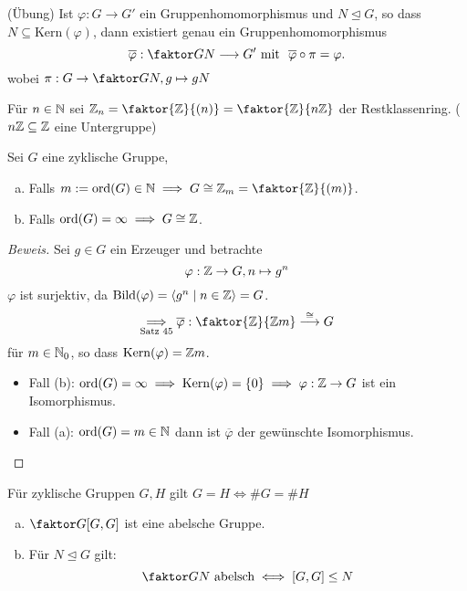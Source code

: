 \documentclass[a4paper]{report}
\begin{document}
\begin{satz45'}[Homomorphiesatz'](Übung)
  Ist $\varphi : G \to G'$ ein Gruppenhomomorphismus und $N \trianglelefteq G$, so dass $N \subseteq \mathrm{Kern}(\varphi)$, dann existiert genau ein Gruppenhomomorphismus $$\overline\varphi : \faktor GN \longrightarrow G'\text{ mit }\ \overline\varphi \circ \pi = \varphi.$$
  wobei $\pi : G \to \faktor GN, g \mapsto gN$
\end{satz45'}
\begin{nota*}
Für $n \in \Bbb N$ sei $\Bbb Z_{n} = \faktor {\Bbb Z}{(n)} = \faktor{\Bbb Z}{n\Bbb Z}$ der Restklassenring. ($n\Bbb Z \subseteq \Bbb Z $ eine Untergruppe)
\end{nota*}

\begin{kor}
  Sei $G$ eine zyklische Gruppe,
  \begin{enumerate}[(a)]
    \item Falls $m:= \mathrm{ord}(G) \in \Bbb N \implies G \cong \Bbb Z_{m} = \faktor{\Bbb Z}{(m)}$.
          \item Falls $\mathrm{ord}(G) = \infty \implies G \cong \Bbb Z$.
  \end{enumerate}
\begin{proof}[Beweis]
  Sei $g \in G$ ein Erzeuger und betrachte $$\varphi : \Bbb Z \to G, n \mapsto g^{n}$$
  $\varphi$ ist surjektiv, da $\mathrm{Bild}(\varphi) = \langle g^{n} \mid n \in \Bbb Z \rangle = G$.
  $$\underset{\text{Satz 45}}\implies \overline\varphi : \faktor{\Bbb Z}{\Bbb Zm} \overset \cong \longrightarrow{} G$$
  für $m \in \Bbb N_{0}$, so dass $\mathrm{Kern}(\varphi) = \Bbb Zm$.
  \begin{itemize}
\item Fall (b): $\mathrm{ord}(G) = \infty \implies \mathrm{Kern}(\varphi) = \{0\} \implies \varphi : \Bbb Z \to G$ ist ein Isomorphismus.
\item Fall (a): $\mathrm{ord}(G) = m \in \Bbb N$ dann ist $\overline\varphi$ der gewünschte Isomorphismus.
 \end{itemize}
\end{proof}
\end{kor}
\begin{kor}Für zyklische Gruppen $G, H$ gilt $G = H \iff \#G = \#H$
\end{kor}
\begin{ubng*}
\begin{enumerate}[(a)]
  \item $\faktor G{[G, G]}$ ist eine abelsche Gruppe.
  \item Für $N \trianglelefteq G$ gilt:
        $$\faktor GN \text{ abelsch} \iff [G, G] \le N$$
\end{enumerate}
\end{ubng*}
\end{document}
